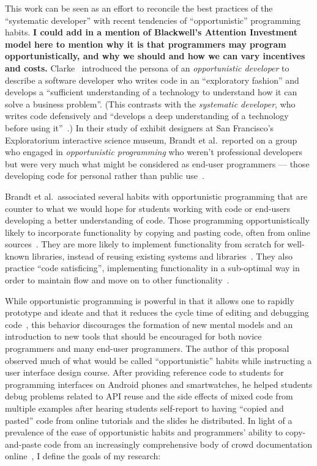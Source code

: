 \documentclass[12pt]{memoir}
\title{}
\author{Andrew Head}
\begin{document}


This work can be seen as an effort to reconcile the best practices of the ``systematic developer'' with recent tendencies of ``opportunistic'' programming habits.
\textbf{I could add in a mention of Blackwell's Attention Investment model here to mention why it is that programmers may program opportunistically, and why we should and how we can vary incentives and costs.}
Clarke~\cite{clarke_what_2007} introduced the persona of an \emph{opportunistic developer} to describe a software developer who writes code in an ``exploratory fashion'' and develops a ``sufficient understanding of a technology to understand how it can solve a business problem''.
(This contrasts with the \emph{systematic developer}, who writes code defensively and ``develops a deep understanding of a technology before using it''~\cite{clarke_what_2007}.)
In their study of exhibit designers at San Francisco's Exploratorium interactive science museum, Brandt et al.\ reported on a group who engaged in \emph{opportunistic programming} who weren't professional developers~\cite{brandt_opportunistic_2008} but were very much what might be considered as end-user programmers --- those developing code for personal rather than public use~\cite{ko_state_2011}.

Brandt et al.\ associated several habits with opportunistic programming that are counter to what we would hope for students working with code or end-users developing a better understanding of code.
Those programming opportunistically likely to incorporate functionality by copying and pasting code, often from online sources~\cite{brandt_two_2009}.
They are more likely to implement functionality from scratch for well-known libraries, instead of reusing existing systems and libraries~\cite{brandt_opportunistic_2008}.
They also practice ``code satisficing'', implementing functionality in a sub-optimal way in order to maintain flow and move on to other functionality~\cite{brandt_opportunistic_2008}.

While opportunistic programming is powerful in that it allows one to rapidly prototype and ideate and that it reduces the cycle time of editing and debugging code~\cite{brandt_opportunistic_2008}, this behavior discourages the formation of new mental models and an introduction to new tools that should be encouraged for both novice programmers and many end-user programmers.
The author of this proposal observed much of what would be called ``opportunistic'' habits while instructing a user interface design course.
After providing reference code to students for programming interfaces on Android phones and smartwatches, he helped students debug problems related to API reuse and the side effects of mixed code from multiple examples after hearing students self-report to having ``copied and pasted'' code from online tutorials and the slides he distributed.
In light of a prevalence of the ease of opportunistic habits and programmers' ability to copy-and-paste code from an increasingly comprehensive body of crowd documentation online~\cite{parnin_crowd_2012}, I define the goals of my research:
\end{document}
